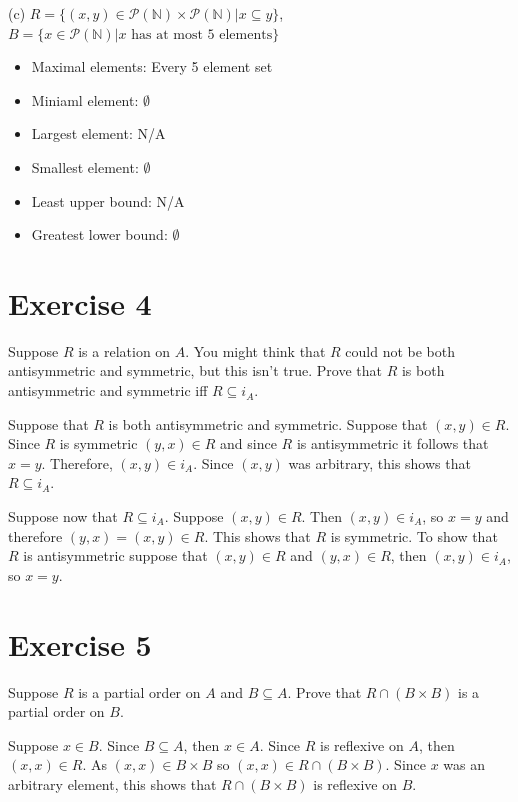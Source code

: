 \documentclass[11pt]{article}
\newcommand{\powerset}[1]{\mathscr{P}(#1)}
\begin{document}
\noindent (c) $R = \{(x,y) \in \powerset{\mathbb{N}} \times \powerset{\mathbb{N}} | x \subseteq y\}$,
$B = \{x \in \powerset{\mathbb{N}} | x \text{ has at most 5 elements} \}$

\begin{itemize}
    \item Maximal elements: Every 5 element set
    \item Miniaml element: $\emptyset$
    \item Largest element: N/A 
    \item Smallest element: $\emptyset$
    \item Least upper bound: N/A
    \item Greatest lower bound: $\emptyset$
\end{itemize}

\section*{Exercise 4}

Suppose $R$ is a relation on $A$. You might think that $R$ could not be both 
antisymmetric and symmetric, but this isn't true. Prove that $R$ is both 
antisymmetric and symmetric iff $R \subseteq i_A$.

Suppose that $R$ is both antisymmetric and symmetric. Suppose that 
$(x, y) \in R$. Since $R$ is symmetric $(y, x) \in R$ and since 
$R$ is antisymmetric it follows that $x = y$. Therefore, $(x, y) \in i_A$.
Since $(x, y)$ was arbitrary, this shows that $R \subseteq i_A$.

Suppose now that $R \subseteq i_A$. Suppose $(x, y) \in R$. Then
$(x, y) \in i_A$, so $x=y$ and therefore $(y, x) = (x, y) \in R$.
This shows that $R$ is symmetric. To show that $R$ is antisymmetric suppose that 
$(x, y) \in R$ and $(y, x) \in R$, then $(x, y) \in i_A$, so $x = y$.

\section*{Exercise 5}

Suppose $R$ is a partial order on $A$ and $B \subseteq A$. Prove that 
$R \cap (B \times B)$ is a partial order on $B$.

Suppose $x \in B$. Since $B \subseteq A$, then $x \in A$. Since $R$ is reflexive
on $A$, then $(x, x) \in R$. As $(x, x) \in B \times B$ so 
$(x, x) \in R \cap (B \times B)$. Since $x$ was an arbitrary element, this 
shows that $R \cap (B \times B)$ is reflexive on $B$.
\end{document}
